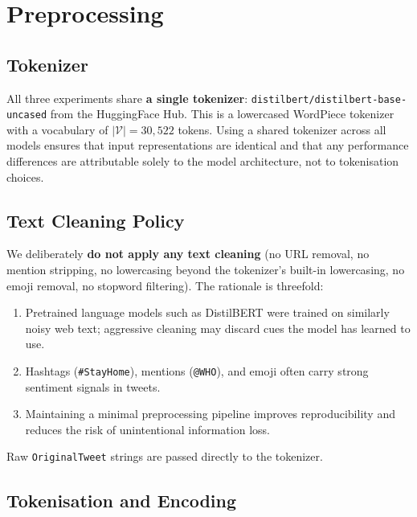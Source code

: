 \section{Preprocessing}

\subsection{Tokenizer}

All three experiments share \textbf{a single tokenizer}: \texttt{distilbert/distilbert-base-uncased} from the HuggingFace Hub. This is a lowercased WordPiece tokenizer with a vocabulary of $|\mathcal{V}| = 30{,}522$ tokens. Using a shared tokenizer across all models ensures that input representations are identical and that any performance differences are attributable solely to the model architecture, not to tokenisation choices.

\subsection{Text Cleaning Policy}

We deliberately \textbf{do not apply any text cleaning} (no URL removal, no mention stripping, no lowercasing beyond the tokenizer's built-in lowercasing, no emoji removal, no stopword filtering). The rationale is threefold:

\begin{enumerate}
    \item Pretrained language models such as DistilBERT were trained on similarly noisy web text; aggressive cleaning may discard cues the model has learned to use.
    \item Hashtags (\texttt{\#StayHome}), mentions (\texttt{@WHO}), and emoji often carry strong sentiment signals in tweets.
    \item Maintaining a minimal preprocessing pipeline improves reproducibility and reduces the risk of unintentional information loss.
\end{enumerate}

Raw \texttt{OriginalTweet} strings are passed directly to the tokenizer.

\subsection{Tokenisation and Encoding}

